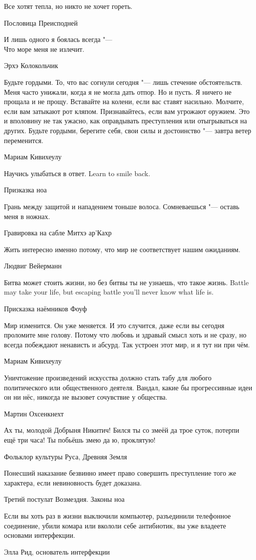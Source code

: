 \epigraph
{Все хотят тепла, но никто не хочет гореть.}
{Пословица Преисподней}

\epigraph
{\ldotst И лишь одного я боялась всегда "---\\
Что море меня не излечит.}
{Эрхэ Колокольчик}

\epigraph
{Будьте гордыми.
То, что вас согнули сегодня "--- лишь стечение обстоятельств.
Меня часто унижали, когда я не могла дать отпор.
Но и пусть.
Я ничего не прощала и не прощу.
Вставайте на колени, если вас ставят насильно.
Молчите, если вам затыкают рот кляпом.
Признавайтесь, если вам угрожают оружием.
Это и вполовину не так ужасно, как оправдывать преступления или отыгрываться на других.
Будьте гордыми, берегите себя, свои силы и достоинство "--- завтра ветер переменится.}
{Мариам Кивихеулу}

\epigraph{
{Научись улыбаться в ответ.}
{Learn to smile back.}
}{Призказка ноа}

\epigraph
{Грань между защитой и нападением тоньше волоса.
Сомневаешься "--- оставь меня в ножнах.}
{Гравировка на сабле Митхэ ар'Кахр}

\epigraph
{Жить интересно именно потому, что мир не соответствует нашим ожиданиям.}
{Людвиг Вейерманн}

\epigraph{
{Битва может стоить жизни, но без битвы ты не узнаешь, что такое жизнь.}
{Battle may take your life, but escaping battle you'll never know what life is.}
}{Присказка наёмников Фоуф}

\epigraph
{Мир изменится.
Он уже меняется.
И это случится, даже если вы сегодня проломите мне голову.
Потому что любовь и здравый смысл хоть и не сразу, но всегда побеждают ненависть и абсурд.
Так устроен этот мир, и я тут ни при чём.}
{Мариам Кивихеулу}

\epigraph
{Уничтожение произведений искусства должно стать табу для любого политического или общественного деятеля.
Вандал, какие бы прогрессивные идеи он ни нёс, никогда не вызовет сочувствие у общества.}
{Мартин Охсенкнехт}

\epigraph
{Ах ты, молодой Добрыня Никитич!
Бился ты со змеёй да трое суток, потерпи ещё три часа!
Ты побьёшь змею да ю, проклятую!}
{Фольклор культуры Руса, Древняя Земля}

\epigraph
{Понесший наказание безвинно имеет право совершить преступление того же характера, если невиновность будет доказана.}
{Третий постулат Возмездия.
Законы ноа}

\epigraph
{Если вы хоть раз в жизни выключили компьютер, разъединили телефонное соединение, убили комара или вкололи себе антибиотик, вы уже владеете основами интерфекции.}
{Элла Рид, основатель интерфекции}

